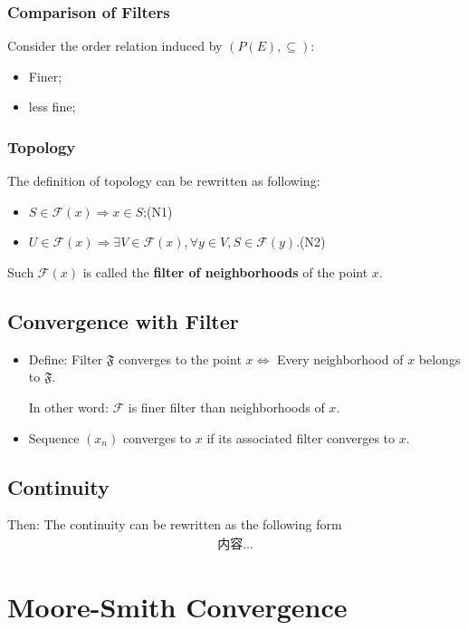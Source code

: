 \documentclass[Total.tex]{subfiles}
\begin{document}
				\subsubsection{Comparison of Filters}
				Consider the order relation induced by $(P(E),\subseteq)$:
				\begin{itemize}
					\item Finer;
					\item less fine;
				\end{itemize}
				
				\subsubsection{Topology}
				The definition of topology can be rewritten as following:
				\begin{itemize}
					\item $S\in \mathcal{F}(x)\Rightarrow x\in S$;(N1)
					\item $U\in \mathcal{F}(x)\Rightarrow \exists V\in \mathcal{F}(x),\forall y\in V,S\in \mathcal{F}(y)$.(N2)
				\end{itemize}
				Such $\mathcal{F}(x)$ is called the \textbf{filter of neighborhoods} of the point $x$.
			\subsection{Convergence with Filter}
			\begin{Def}
				\begin{itemize}
					\item Define: Filter $\mathfrak{F}$ converges to the point $x\Leftrightarrow$ Every neighborhood of $x$ belongs to $\mathfrak{F}$.
					
					In other word: $\mathcal{F}$ is finer filter than neighborhoods of $x$.
					\item Sequence $(x_n)$ converges to $x$ if its associated filter converges to $x$.
				\end{itemize}
			\end{Def}
			\subsection{Continuity}
				Then: The continuity can be rewritten as the following form
				\begin{gather*}
					内容...
				\end{gather*}
		\section{Moore-Smith Convergence}
\end{document}
